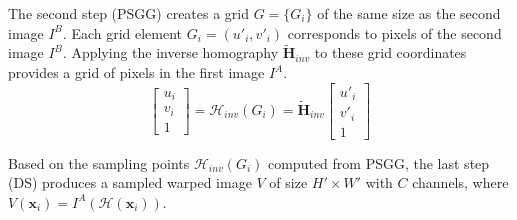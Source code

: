 \documentclass[letterpaper, 10 pt, conference]{ieeeconf}
\begin{document}
The second step (PSGG) creates a grid $G = \{G_i\}$ of the same size as the second image $I^{B}$. Each grid element $G_i = (u'_i, v'_i)$ corresponds to pixels of the second image $I^{B}$. Applying the inverse homography $\mathbf{\tilde{H}}_{inv}$ to these grid coordinates provides a grid of pixels in the first image $I^{A}$. 
\begin{equation}
            \begin{bmatrix}
            u_i \\ 
            v_i  \\
            1 
			\end{bmatrix} = \mathcal{H}_{inv} (G_i) = \mathbf{\tilde{H}}_{inv}
            \begin{bmatrix}
            u'_i \\ 
            v'_i   \\ 
            1  
			\end{bmatrix} 
\end{equation}

Based on the sampling points $\mathcal{H}_{inv} (G_i)$ computed from PSGG, the last step (DS) produces a sampled warped image $V$ of size $H' \times W'$ with $C$ channels, where $V(\mathbf{x}_{i}) = I^{A}(\mathcal{H}(\mathbf{x}_{i}))$. 
\end{document}
